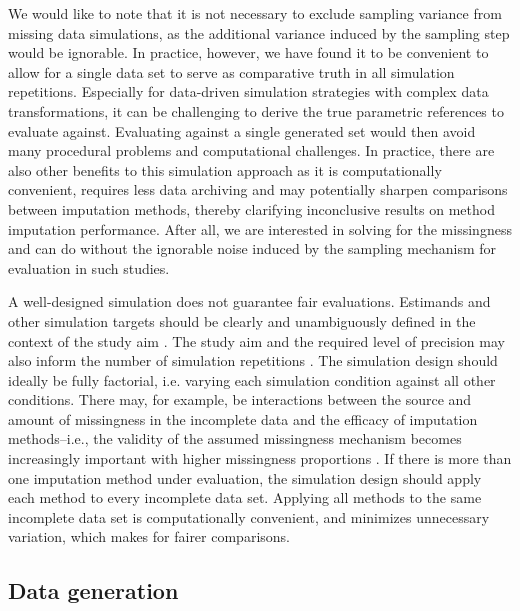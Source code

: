 \documentclass[bimj,fleqn]{w-art}
\begin{document}
We would like to note that it is not necessary to exclude sampling variance from missing data simulations, as the additional variance induced by the sampling step would be ignorable. In practice, however, we have found it to be convenient to allow for a single data set to serve as comparative truth in all simulation repetitions. Especially for data-driven simulation strategies with complex data transformations, it can be challenging to derive the true parametric references to evaluate against. Evaluating against a single generated set would then avoid many procedural problems and computational challenges. In practice, there are also other benefits to this simulation approach as it is computationally convenient, requires less data archiving and may potentially sharpen comparisons between imputation methods, thereby clarifying inconclusive results on method imputation performance. After all, we are interested in solving for the missingness and can do without the ignorable noise induced by the sampling mechanism for evaluation in such studies. 

A well-designed simulation does not guarantee fair evaluations. Estimands and other simulation targets should be clearly and unambiguously defined in the context of the study aim \citep{pete14}. The study aim and the required level of precision may also inform the number of simulation repetitions \citep[e.g. as determined from a maximum tolerable level of uncertainty in terms of a performance measure's Monte Carlo error; see][]{morr18}. The simulation design should ideally be fully factorial, i.e. varying each simulation condition against all other conditions. There may, for example, be interactions between the source and amount of missingness in the incomplete data and the efficacy of imputation methods--i.e., the validity of the assumed missingness mechanism becomes increasingly important with higher missingness proportions \citep{scho18}. If there is more than one imputation method under evaluation, the simulation design should apply each method to every incomplete data set. Applying all methods to the same incomplete data set is computationally convenient, and minimizes unnecessary variation, which makes for fairer comparisons.


\subsection{Data generation}
\end{document}
